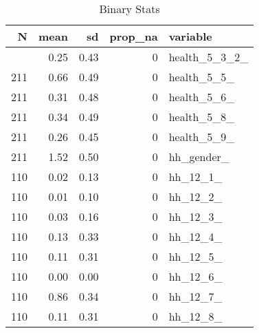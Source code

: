 \begin{table}[!t]
\caption*{
{\large Binary Stats}
} 
\fontsize{12.0pt}{14.4pt}\selectfont
\begin{tabular*}{\linewidth}{@{\extracolsep{\fill}}rrrrl}
\toprule
N & mean & sd & prop\_na & variable \\ 
\midrule\addlinespace[2.5pt]
211 & 0.25 & 0.43 & 0 & health\_5\_3\_2\_ \\ 
211 & 0.66 & 0.49 & 0 & health\_5\_5\_ \\ 
211 & 0.31 & 0.48 & 0 & health\_5\_6\_ \\ 
211 & 0.34 & 0.49 & 0 & health\_5\_8\_ \\ 
211 & 0.26 & 0.45 & 0 & health\_5\_9\_ \\ 
211 & 1.52 & 0.50 & 0 & hh\_gender\_ \\ 
110 & 0.02 & 0.13 & 0 & hh\_12\_1\_ \\ 
110 & 0.01 & 0.10 & 0 & hh\_12\_2\_ \\ 
110 & 0.03 & 0.16 & 0 & hh\_12\_3\_ \\ 
110 & 0.13 & 0.33 & 0 & hh\_12\_4\_ \\ 
110 & 0.11 & 0.31 & 0 & hh\_12\_5\_ \\ 
110 & 0.00 & 0.00 & 0 & hh\_12\_6\_ \\ 
110 & 0.86 & 0.34 & 0 & hh\_12\_7\_ \\ 
110 & 0.11 & 0.31 & 0 & hh\_12\_8\_ \\ 
\bottomrule
\end{tabular*}
\end{table}

